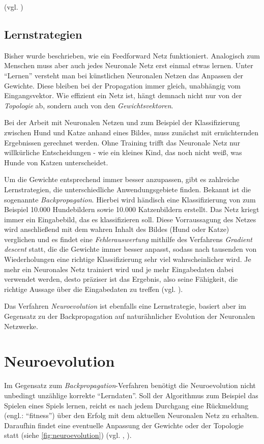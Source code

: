 \documentclass[parskip=half,titlepage]{scrartcl}
\begin{document}
(vgl. \cite{zell_2003} )

\subsection*{Lernstrategien}
Bisher wurde beschrieben, wie ein Feedforward Netz funktioniert. Analogisch zum Menschen muss aber auch jedes Neuronale Netz erst einmal etwas lernen. Unter ``Lernen'' versteht man bei künstlichen Neuronalen Netzen das Anpassen der Gewichte. Diese bleiben bei der Propagation immer gleich, unabhängig vom Eingangsvektor. Wie effizient ein Netz ist, hängt demnach nicht nur von der \textit{Topologie} ab, sondern auch von den \textit{Gewichtsvektoren}.

Bei der Arbeit mit Neuronalen Netzen und zum Beispiel der Klassifizierung zwischen Hund und Katze anhand eines Bildes, muss zunächst mit ernüchternden Ergebnissen gerechnet werden. Ohne Training trifft das Neuronale Netz nur willkürliche Entscheidungen - wie ein kleines Kind, das noch nicht weiß, was Hunde von Katzen unterscheidet. 

Um die Gewichte entsprechend immer besser anzupassen, gibt es zahlreiche Lernstrategien, die unterschiedliche Anwendungsgebiete finden. Bekannt ist die sogenannte \textit{Backpropagation}. Hierbei wird händisch eine Klassifizierung  von zum Beispiel 10.000 Hundebildern sowie 10.000 Katzenbildern erstellt. Das Netz kriegt immer ein Eingabebild, das es klassifizieren soll. Diese Vorraussagung des Netzes wird anschließend mit dem wahren Inhalt des Bildes (Hund oder Katze) verglichen und es findet eine \textit{Fehlerauswertung} mithilfe des Verfahrens \textit{Gradient descent} statt, die die Gewichte immer besser anpasst, sodass nach tausenden von Wiederholungen eine richtige Klassifizierung sehr viel wahrscheinlicher wird. Je mehr ein Neuronales Netz trainiert wird und je mehr Eingabedaten dabei verwendet werden, desto präziser ist das Ergebnis, also seine Fähigkeit, die richtige Aussage über die Eingabedaten zu treffen (vgl. \cite[149ff]{Steinwendner2019} ). 

Das Verfahren \textit{Neuroevolution} ist ebenfalls eine Lernstrategie, basiert aber im Gegensatz zu der Backpropagation auf naturähnlicher Evolution der Neuronalen Netzwerke. 

\section{Neuroevolution}
\label{sec:neuroevolution}
Im Gegensatz zum \textit{Backpropagation}-Verfahren benötigt die Neuroevolution nicht unbedingt unzählige korrekte ``Lerndaten''. Soll der  Algorithmus zum Beispiel das Spielen eines Spiels lernen, reicht es nach jedem Durchgang eine Rückmeldung (engl.: ``fitness'') über den Erfolg mit dem aktuellen Neuronalen Netz zu erhalten. Daraufhin findet eine eventuelle Anpassung der Gewichte oder der Topologie statt (siehe \cref{fig:neuroevolution}) (vgl. \cite{stanley_2017}, \cite[25-28]{eiben_smith_2016} ).
\end{document}
